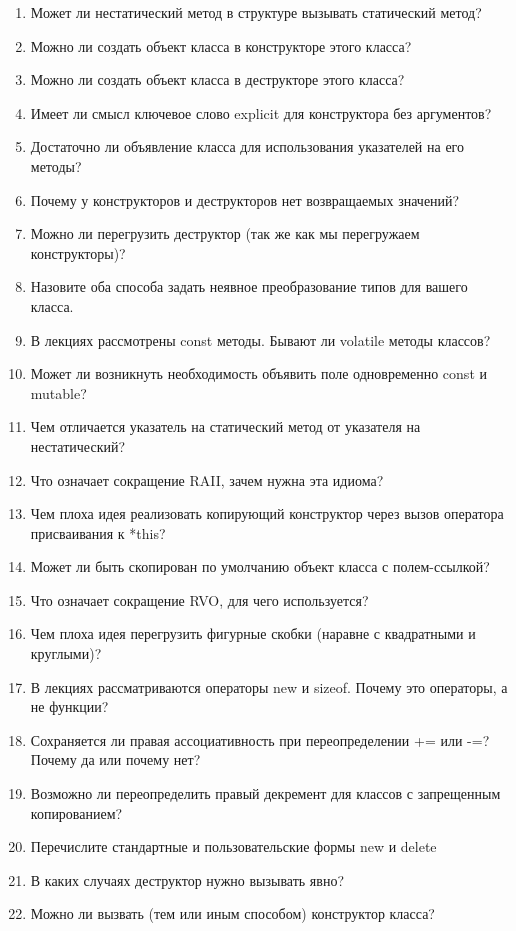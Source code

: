 \documentclass[a4paper,12pt,oneside]{article}
\begin{document}
\begin{enumerate}
\item Может ли нестатический метод в структуре вызывать статический метод?
\item Можно ли создать объект класса в конструкторе этого класса?
\item Можно ли создать объект класса в деструкторе этого класса?
\item Имеет ли смысл ключевое слово explicit для конструктора без аргументов?
\item Достаточно ли объявление класса для использования указателей на его методы?
\item Почему у конструкторов и деструкторов нет возвращаемых значений?
\item Можно ли перегрузить деструктор (так же как мы перегружаем конструкторы)?
\item Назовите оба способа задать неявное преобразование типов для вашего класса.
\item В лекциях рассмотрены const методы. Бывают ли volatile методы классов?
\item Может ли возникнуть необходимость объявить поле одновременно const и mutable?
\item Чем отличается указатель на статический метод от указателя на нестатический?
\item Что означает сокращение RAII, зачем нужна эта идиома?
\item Чем плоха идея реализовать копирующий конструктор через вызов оператора присваивания к *this?
\item Может ли быть скопирован по умолчанию объект класса с полем-ссылкой?
\item Что означает сокращение RVO, для чего используется?
\item Чем плоха идея перегрузить фигурные скобки (наравне с квадратными и круглыми)?
\item В лекциях рассматриваются операторы new и sizeof. Почему это операторы, а не функции?
\item Сохраняется ли правая ассоциативность при переопределении += или -=? Почему да или почему нет?
\item Возможно ли переопределить правый декремент для классов с запрещенным копированием?
\item Перечислите стандартные и пользовательские формы new и delete
\item В каких случаях деструктор нужно вызывать явно?
\item Можно ли вызвать (тем или иным способом) конструктор класса?

\end{enumerate}
\end{document}
